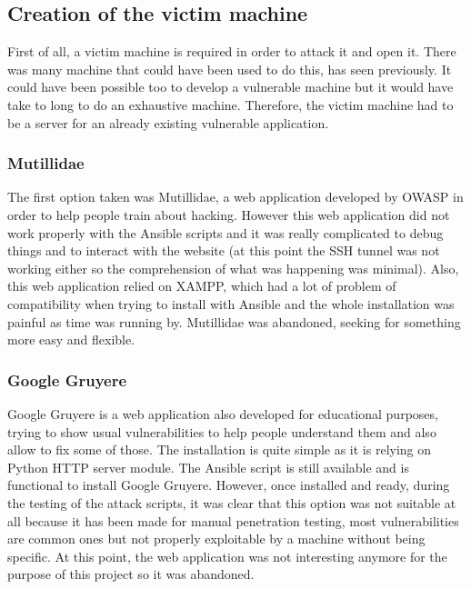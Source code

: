 \documentclass[a4paper,12pt,fleqn]{article}
\begin{document}
\subsection{Creation of the victim machine}

First of all, a victim machine is required in order to attack it and open it. There was many machine that could have been used to do this, has seen previously. It could have been possible too to develop a vulnerable machine but it would have take to long to do an exhaustive machine. Therefore, the victim machine had to be a server for an already existing vulnerable application.

\subsubsection{Mutillidae}
 
 The first option taken was Mutillidae, a web application developed by OWASP in order to help people train about hacking. However this web application did not work properly with the Ansible scripts and it was really complicated to debug things and to interact with the website (at this point the SSH tunnel was not working either so the comprehension of what was happening was minimal). Also, this web application relied on XAMPP, which had a lot of problem of compatibility when trying to install with Ansible and the whole installation was painful as time was running by. Mutillidae was abandoned, seeking for something more easy and flexible.

 \subsubsection{Google Gruyere}

Google Gruyere is a web application also developed for educational purposes, trying to show usual vulnerabilities to help people understand them and also allow to fix some of those. The installation is quite simple as it is relying on Python HTTP server module. The Ansible script is still available and is functional to install Google Gruyere. However, once installed and ready, during the testing of the attack scripts, it was clear that this option was not suitable at all because it has been made for manual penetration testing, most vulnerabilities are common ones but not properly exploitable by a machine without being specific. At this point, the web application was not interesting anymore for the purpose of this project so it was abandoned.
\end{document}
